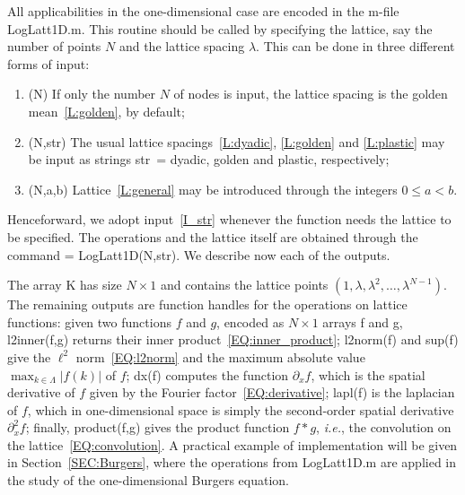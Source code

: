 \documentclass[12pt]{article}
\theoremstyle{definition}
\begin{document}
	All applicabilities in the one-dimensional case are encoded in the m-file {\mlttfamily LogLatt1D.m}.
	This routine should be called by specifying the lattice, say the number of points $N$ and the lattice spacing $\lambda$.
	This can be done in three different forms of input:
	\begin{enumerate}[label=\textit{(I.\arabic*)}]
		\item {\mlttfamily(N)} If only the number $N$ of nodes is input, the lattice spacing is the golden mean~\ref{L:golden}, by default;
		\label{I_default}
		\item {\mlttfamily(N,str)} The usual lattice spacings~\ref{L:dyadic}, \ref{L:golden} and \ref{L:plastic} may be input as strings {\mlttfamily str~= \textquotesingle dyadic\textquotesingle}, {\mlttfamily \textquotesingle golden\textquotesingle} and {\mlttfamily \textquotesingle plastic\textquotesingle}, respectively;
		\label{I_str}
		\item {\mlttfamily(N,a,b)} Lattice~\ref{L:general} may be introduced through the integers $0 \leq a < b$.
		\label{I_integers}
	\end{enumerate}
	Henceforward, we adopt input~\ref{I_str} whenever the function needs the lattice to be specified.
	The operations and the lattice itself are obtained through the command { = LogLatt1D(N,str)}.
	We describe now each of the outputs.
	
	The array {\mlttfamily K} has size $N \times 1$ and contains the lattice points $(1,\lambda,\lambda^2,\dots,\lambda^{N-1})$.
	The remaining outputs are function handles for the operations on lattice functions:
	given two functions $f$ and $g$, encoded as $N \times 1$ arrays {\mlttfamily f} and {\mlttfamily g}, {\mlttfamily l2inner(f,g)} returns their inner product~\eqref{EQ:inner_product};
	{\mlttfamily l2norm(f)} and {\mlttfamily sup(f)} give the $\ell^2$ norm~\eqref{EQ:l2norm} and the maximum absolute value $\max_{k \in \mathbb{\Lambda}}|f(k)|$ of $f$;
	{\mlttfamily dx(f)} computes the function $\partial_x f$, which is the spatial derivative of $f$ given by the Fourier factor~\eqref{EQ:derivative};
	{\mlttfamily lapl(f)} is the laplacian of $f$, which in one-dimensional space is simply the second-order spatial derivative $\partial_x^2 f$;
	finally, {\mlttfamily product(f,g)} gives the product function $f \ast g$, \textit{i.e.}, the convolution on the lattice~\eqref{EQ:convolution}.
	A practical example of implementation will be given in Section~\ref{SEC:Burgers}, where the operations from {\mlttfamily LogLatt1D.m} are applied in the study of the one-dimensional Burgers equation.
	
\end{document}
